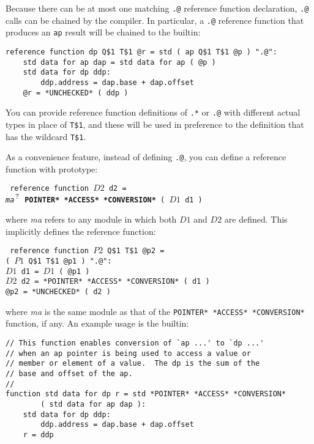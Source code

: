 \documentclass[12pt]{article}
\newcommand{\QMARK}{{$^{\,\mbox{\footnotesize ?}}$}}
\newcommand{\ttkey}[1]{{\tt \bfseries #1}}
\newenvironment{indpar}[1][0.3in]%
	{\begin{list}{}%
		     {\setlength{\itemsep}{0in}%
		      \setlength{\topsep}{0in}%
		      \setlength{\parsep}{1ex}%
		      \setlength{\labelwidth}{#1}%
		      \setlength{\leftmargin}{#1}%
		      \addtolength{\leftmargin}{\labelsep}}%
	 \item}%
	{\end{list}}
\begin{document}
Because there can be at most one matching {\tt .@} reference function 
declaration, {\tt .@} calls can be chained by the compiler.  In particular,
a {\tt .@} reference function that produces an {\tt ap} result will
be chained to the builtin:
\begin{indpar}\begin{verbatim}
reference function dp Q$1 T$1 @r = std ( ap Q$1 T$1 @p ) ".@":
    std data for ap dap = std data for ap ( @p )
    std data for dp ddp:
        ddp.address = dap.base + dap.offset
    @r = *UNCHECKED* ( ddp )
\end{verbatim}\end{indpar}

You can provide reference function definitions of {\tt .*} or {\tt .@}
with different actual
types in place of {\tt T\$1}, and these will be used in preference
to the definition that has the wildcard {\tt T\$1}.

As a convenience feature, instead of defining {\tt .@}, you
can define a reference function with prototype:
\begin{indpar} \tt
reference function $D2$ d2 = \\
\hspace*{4em} {\em ma}\QMARK{} \ttkey{*POINTER* *ACCESS* *CONVERSION*}
		( $D1$ d1 )
\end{indpar}
where {\em ma} refers to any module in which both $D1$ and $D2$ are defined.
This implicitly defines the reference function:
\begin{indpar} \tt
reference function $P2$ Q\$1 T\$1 @p2 = \\
\hspace*{1in}{\em ma}\QMARK{} ( $P1$ Q\$1 T\$1 @p1 ) ".@": \\
\hspace*{0.3in}$D1$ d1 = $D1$ ( @p1 ) \\
\hspace*{0.3in}$D2$ d2 = *POINTER* *ACCESS* *CONVERSION* ( d1 ) \\
\hspace*{0.3in}@p2 = *UNCHECKED* ( d2 )
\end{indpar}
where {\em ma} is the same module as that of the
{\tt *POINTER* *ACCESS* *CONVERSION*} function, if any.
An example usage is the builtin:
\begin{indpar}\begin{verbatim}
// This function enables conversion of `ap ...' to `dp ...'
// when an ap pointer is being used to access a value or
// member or element of a value.  The dp is the sum of the
// base and offset of the ap.
//
function std data for dp r = std *POINTER* *ACCESS* *CONVERSION*
        ( std data for ap dap ):
    std data for dp ddp:
        ddp.address = dap.base + dap.offset
    r = ddp
\end{verbatim}\end{indpar}
\end{document}

